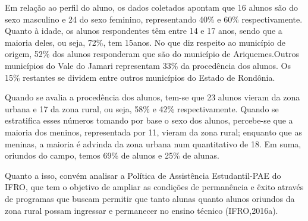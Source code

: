 \documentclass[article,12pt,onesidea,4paper,english,brazil]{abntex2}
\begin{document}
	Em relação ao perfil do aluno, os dados coletados apontam que 16 alunos  são do sexo masculino e 24 do sexo feminino, representando 40\% e 60\% respectivamente. Quanto à idade, os alunos respondentes têm entre 14 e 17 anos, sendo que a maioria deles, ou seja, 72\%, tem 15anos.
	No que diz respeito ao município de origem, 52\% dos alunos responderam que são do município de Ariquemes.Outros municípios do Vale do Jamari representam 33\% da procedência dos alunos. Os 15\% restantes se dividem entre outros municípios do Estado de Rondônia.
	
	Quando se avalia a procedência dos alunos, tem-se que 23 alunos vieram da zona urbana e 17 da zona rural, ou seja, 58\% e 42\% respectivamente. Quando se estratifica esses números tomando por base o sexo dos alunos, percebe-se que a maioria dos meninos, representada por 11, vieram da zona rural; enquanto que as meninas, a maioria é advinda da zona urbana num quantitativo de 18. Em suma, oriundos do campo, temos 69\% de alunos e 25\% de alunas.
	
	Quanto a isso, convém analisar a Política de Assistência Estudantil-PAE do IFRO, que tem o objetivo de ampliar as condições de permanência e êxito através  de programas que buscam permitir que tanto alunas quanto alunos oriundos da zona rural possam ingressar e permanecer no ensino técnico (IFRO,2016a).
	
\end{document}
